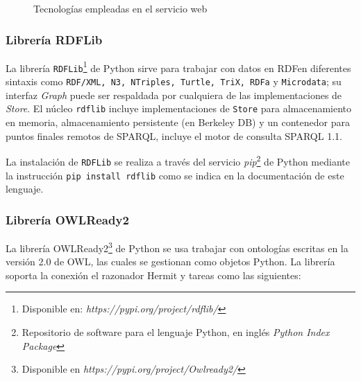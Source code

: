 \begin{figure}[!ht]
	\centering
    \caption{Tecnolog\'ias empleadas en el servicio web}
    \label{tecnologiasServicio}
\end{figure}

\subsubsection{Librer\'ia RDFLib}

La librer\'ia \texttt{RDFLib}\footnote{Disponible en: \textit{https://pypi.org/project/rdflib/}} de Python sirve para trabajar con datos en RDFen diferentes sintaxis como \texttt{RDF/XML, N3, NTriples, Turtle, TriX, RDFa} y \texttt{Microdata}; su interfaz \textit{Graph} puede ser respaldada por cualquiera de las implementaciones de \textit{Store}. El n\'ucleo \texttt{rdflib} incluye implementaciones de \texttt{Store} para almacenamiento en memoria, almacenamiento persistente (en Berkeley DB) y un contenedor para puntos finales remotos de SPARQL, incluye el motor de consulta SPARQL 1.1.

La instalaci\'on de \texttt{RDFLib} se realiza a trav\'es del servicio \textit{pip}\footnote{Repositorio de software para el lenguaje Python, en ingl\'es \textit{Python Index Package} } de Python mediante la instrucci\'on \texttt{pip install rdflib} como se indica en la documentaci\'on de este lenguaje. 

\subsubsection{Librer\'ia OWLReady2}

La librer\'ia OWLReady2\footnote{Disponible en \emph{https://pypi.org/project/Owlready2/}}  de Python se usa trabajar con ontolog\'ias escritas en la versi\'on 2.0 de OWL, las cuales se gestionan como objetos Python. La librer\'ia soporta la conexi\'on el razonador Hermit y tareas como las siguientes: 

